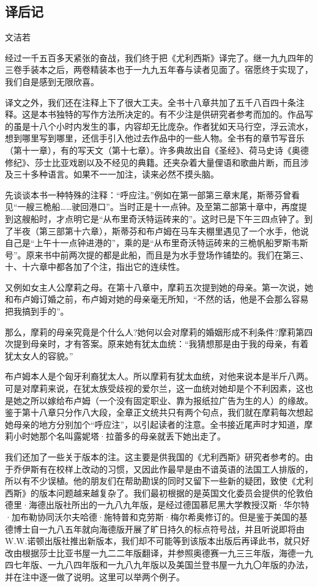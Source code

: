 \subsection*{译后记}

\begin{center}
    \par 文洁若
\end{center}
\par 经过一千五百多天紧张的奋战，我们终于把《尤利西斯》译完了。继一九九四年的三卷手装本之后，两卷精装本也于一九九五年春与读者见面了。宿愿终于实现了，我们自是感到无限欣喜。
\par 译文之外，我们还在注释上下了很大工夫。全书十八章共加了五千八百四十条注释。这是本书独特的写作方法所决定的。有不少注是供研究者参考而加的。作品写的虽是十八个小时内发生的事，内容却无比庞杂。作者犹如天马行空，浮云流水，想到哪里写到哪里，还信手引入他过去作品中的一些人物。全书有的章节写音乐（第十一章），有的写天文（第十七章）。许多典故出自《圣经》、荷马史诗《奥德修纪》、莎士比亚戏剧以及不经见的典籍。还夹杂着大量俚语和歌曲片断，而且涉及三十多种语言。如果不一一加注，读来必然不摸头脑。
\par 先谈谈本书一种特殊的注释：“呼应注。”例如在第一部第三章末尾，斯蒂芬曾看见“一艘三桅船……驶回港口”。当时正是十一点钟。及至第二部第十章中，再度提到这艘船时，才点明它是“从布里奇沃特运砖来的”。这时已是下午三四点钟了。到了半夜（第三部第十六章），斯蒂芬和布卢姆在马车夫棚里遇见了一个水手，他说自己是“上午十一点钟进港的”，乘的是“从布里奇沃特运砖来的三桅帆船罗斯韦斯号”。原来书中前两次提的都是此船，而且是为水手登场作铺垫的。我们在第三、十、十六章中都各加了个注，指出它的连续性。
\par 又例如女主人公摩莉之母。在第十八章中，摩莉五次提到她的母亲。第一次说，她和布卢姆订婚之前，布卢姆对她的母亲毫无所知，“不然的话，他是不会那么容易把我搞到手的”。
\par 那么，摩莉的母亲究竟是个什么人?她何以会对摩莉的婚姻形成不利条件?摩莉第四次提到母亲时，才有答案。原来她有犹太血统：“我猜想那是由于我的母亲，有着犹太女人的容貌。”
\par 布卢姆本人是个匈牙利裔犹太人。所以摩莉有犹太血统，对他来说本是半斤八两。可是对摩莉来说，在犹太族受歧视的爱尔兰，这一血统对她却是个不利因素，这也是她之所以嫁给布卢姆（一个没有固定职业、靠为报纸拉广告为生的人）的缘故。鉴于第十八章只分作八大段，全章正文统共只有两个句点，我们就在摩莉每次想起她母亲的地方分别加个“呼应注”，以引起读者的注意。全书接近尾声时才知道，摩莉小时她那个名叫露妮塔·拉蕾多的母亲就丢下她出走了。
\par 我们还加了一些关于版本的注。这主要是供我国的《尤利西斯》研究者参考的。由于乔伊斯有在校样上改动的习惯，又因此作最早是由不谙英语的法国工人排版的，所以有不少误植。他的朋友们在帮助勘误的同时又留下一些新的疑团，致使《尤利西斯》的版本问题越来越复杂了。我们最初根据的是英国文化委员会提供的伦敦伯德里·海德出版社所出的一九八九年版，是经过德国慕尼黑大学教授汉斯·华尔特·加布勒协同沃尔夫哈德·施特普和克劳斯·梅尔希奥修订的。但是鉴于美国的基德博士自一九八五年就向海德版开展了旷日持久的标点符号战，并且听说即将由W.W.诺顿出版社推出新版本，我们却不可能等到该版本出版后再译此书，就只好改由根据莎士比亚书屋一九二二年版翻译，并参照奥德赛一九三三年版，海德一九四七年版、一九八四年版和一九八九年版以及美国兰登书屋一九九〇年版的办法，并在注中逐一做了说明。这里可以举两个例子。
